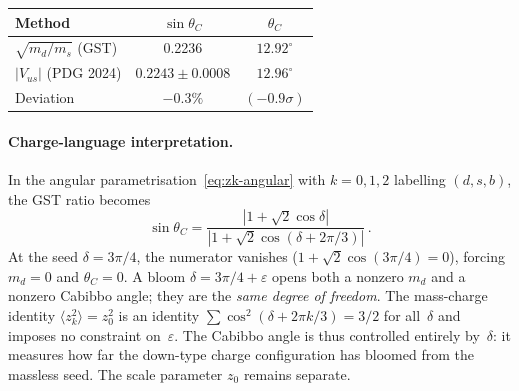 \documentclass[12pt,a4paper]{article}
\begin{document}
\begin{center}
\begin{tabular}{lcc}
\toprule
Method & $\sin\theta_C$ & $\theta_C$ \\
\midrule
$\sqrt{m_d/m_s}$ (GST) & 0.2236 & $12.92^\circ$ \\
$|V_{us}|$ (PDG 2024) & $0.2243 \pm 0.0008$ & $12.96^\circ$ \\
Deviation & $-0.3\%$ & $(-0.9\sigma)$ \\
\bottomrule
\end{tabular}
\end{center}

\paragraph{Charge-language interpretation.}
In the angular parametrisation~\eqref{eq:zk-angular}
with $k = 0,1,2$ labelling $(d, s, b)$, the GST ratio becomes
\begin{equation}
\sin\theta_C
= \frac{|1 + \sqrt{2}\cos\delta|}
       {|1 + \sqrt{2}\cos(\delta + 2\pi/3)|}\,.
\end{equation}
At the seed $\delta = 3\pi/4$, the numerator vanishes
($1 + \sqrt{2}\cos(3\pi/4) = 0$), forcing $m_d = 0$ and
$\theta_C = 0$.
A bloom $\delta = 3\pi/4 + \varepsilon$ opens both a nonzero
$m_d$ and a nonzero Cabibbo angle; they are the \emph{same degree
of freedom}.  The mass-charge identity
$\langle z_k^2\rangle = z_0^2$ is an identity
$\sum \cos^2(\delta + 2\pi k/3) = 3/2$ for all~$\delta$ and
imposes no constraint on~$\varepsilon$.  The Cabibbo angle
is thus controlled entirely by~$\delta$: it measures how far
the down-type charge configuration has bloomed from the massless
seed.  The scale parameter $z_0$ remains separate.
\end{document}
